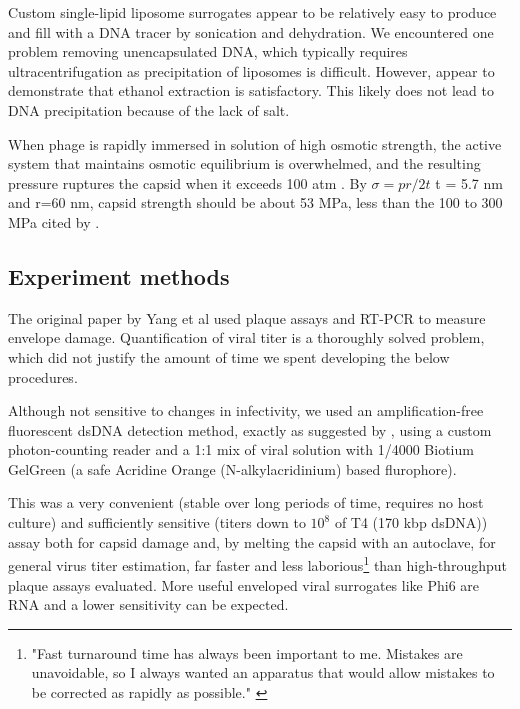 \documentclass[paper.tex]{subfiles}
\begin{document}
\begin{multicols}{1}
Custom single-lipid liposome surrogates appear to be relatively easy to produce and fill with a DNA tracer by sonication and dehydration\cite{Encapsulation1982}\cite{OPTIMIZATION2017}\cite{Liposome2014}. We encountered one problem removing unencapsulated DNA, which typically requires ultracentrifugation as precipitation of liposomes is difficult. However, \cite{novela} appear to demonstrate that ethanol extraction is satisfactory. This likely does not lead to DNA precipitation because of the lack of salt. 

When phage is rapidly immersed in solution of high osmotic strength, the active system that maintains osmotic equilibrium is overwhelmed, and the resulting pressure ruptures the capsid when it exceeds 100 atm \cite{Osmotic2003}. By $\sigma = pr / 2t $ t = 5.7 nm\cite{Head1988} and r=60 nm, capsid strength should be about 53 MPa, less than the 100 to 300 MPa cited by \cite{Bacteriophage2004}.

\subsection{Experiment methods}

The original paper by Yang et al used plaque assays and RT-PCR to measure envelope damage. Quantification of viral titer is a thoroughly solved problem, which did not justify the amount of time we spent developing the below procedures.

Although not sensitive to changes in infectivity, we used an amplification-free fluorescent dsDNA detection method, exactly as suggested by \cite{Quantification2020}, using a custom photon-counting reader and a 1:1 mix of viral solution with 1/4000 Biotium GelGreen (a safe Acridine Orange (N-alkylacridinium) based flurophore). 

This was a very convenient (stable over long periods of time, requires no host culture) and sufficiently sensitive (titers down to $10^8$ of T4 (170 kbp dsDNA)) assay both for capsid damage and, by melting the capsid with an autoclave, for general virus titer estimation, far faster and less laborious\footnote{"Fast turnaround time has always been important to me. Mistakes are unavoidable, so I always wanted an apparatus that would allow mistakes to be corrected as rapidly as possible." \cite{manipulation1998}} than high-throughput plaque assays evaluated\cite{Simple2018}\cite{Streamlining2018}. More useful enveloped viral surrogates like Phi6 are RNA and a lower sensitivity can be expected.\cite{Selected} 


\end{multicols}
\end{document}
